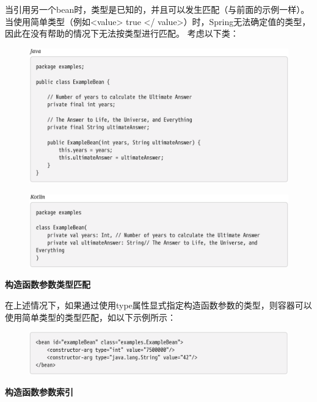 当引用另一个bean时，类型是已知的，并且可以发生匹配（与前面的示例一样）。 当使用简单类型（例如<value> true </ value>）时，Spring无法确定值的类型，因此在没有帮助的情况下无法按类型进行匹配。 考虑以下类：
\begin{figure}[ht]
    \centering
    \includegraphics[width=1\linewidth]{./Figure/IMG_code_25.png}
\end{figure}

\begin{figure}[ht]
    \centering
    \includegraphics[width=1\linewidth]{./Figure/IMG_code_26.png}
\end{figure}


\noindent \small{\textbf{构造函数参数类型匹配}}

在上述情况下，如果通过使用type属性显式指定构造函数参数的类型，则容器可以使用简单类型的类型匹配，如以下示例所示：

\begin{figure}[ht]
    \centering
    \includegraphics[width=1\linewidth]{./Figure/IMG_code_27.png}
\end{figure}

\newpage

\noindent \small{\textbf{构造函数参数索引}}

